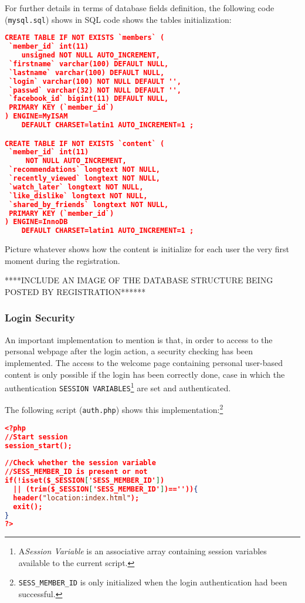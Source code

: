 \documentclass{acm_proc_article-sp}
\begin{document}
For further details in terms of database fields definition, the following code (\texttt{mysql.sql}) shows in SQL code shows the tables initialization: 

\begin{lstlisting}[language=json,firstnumber=1]
CREATE TABLE IF NOT EXISTS `members` (
 `member_id` int(11) 
    unsigned NOT NULL AUTO_INCREMENT,
 `firstname` varchar(100) DEFAULT NULL,
 `lastname` varchar(100) DEFAULT NULL,
 `login` varchar(100) NOT NULL DEFAULT '',
 `passwd` varchar(32) NOT NULL DEFAULT '',
 `facebook_id` bigint(11) DEFAULT NULL,
 PRIMARY KEY (`member_id`)
) ENGINE=MyISAM  
    DEFAULT CHARSET=latin1 AUTO_INCREMENT=1 ;

CREATE TABLE IF NOT EXISTS `content` (
 `member_id` int(11) 
     NOT NULL AUTO_INCREMENT,
 `recommendations` longtext NOT NULL,
 `recently_viewed` longtext NOT NULL,
 `watch_later` longtext NOT NULL,
 `like_dislike` longtext NOT NULL,
 `shared_by_friends` longtext NOT NULL,
 PRIMARY KEY (`member_id`)
) ENGINE=InnoDB  
    DEFAULT CHARSET=latin1 AUTO_INCREMENT=1 ;
\end{lstlisting}

Picture whatever shows how the content is initialize for each user the very first moment during the registration. 

****INCLUDE AN IMAGE OF THE DATABASE STRUCTURE BEING POSTED BY REGISTRATION******

\subsubsection{Login Security}

An important implementation to mention is that, in order to access to the personal webpage after the login action, a security checking has been implemented. The access to the welcome page containing personal user-based content is only possible if the login has been correctly done, case in which the authentication \texttt{SESSION VARIABLES}\footnote{A\textit{Session Variable} is an associative array containing session variables available to the current script.} are set and authenticated. 

The following script (\texttt{auth.php}) shows this implementation:\footnote{\texttt{SESS\_MEMBER\_ID} is only initialized when the login authentication had been successful.}

\begin{lstlisting}[language=json,firstnumber=1]
<?php
//Start session
session_start();
	
//Check whether the session variable 
//SESS_MEMBER_ID is present or not
if(!isset($_SESSION['SESS_MEMBER_ID']) 
  || (trim($_SESSION['SESS_MEMBER_ID'])=='')){
  header("location:index.html");
  exit();
}
?>
\end{lstlisting}
\end{document}
